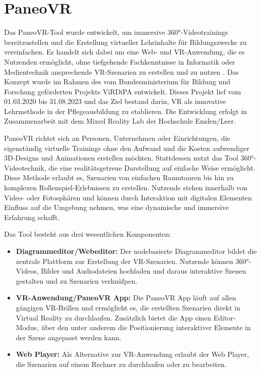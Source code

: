 \section{PaneoVR}

Das PaneoVR-Tool wurde entwickelt, um immersive 360°-Videotrainings bereitzustellen und die Erstellung virtueller Lehrinhalte für Bildungszwecke zu vereinfachen. Es handelt sich dabei um eine Web- und VR-Anwendung, die es Nutzenden ermöglicht, ohne tiefgehende Fachkenntnisse in Informatik oder Medientechnik ansprechende VR-Szenarien zu erstellen und zu nutzen \citep{noauthor_paneovr_nodate}. Das Konzept wurde im Rahmen des vom Bundesministerium für Bildung und Forschung geförderten Projekts ViRDiPA \citep{noauthor_virdipa-_nodate} entwickelt. Dieses Projekt lief vom 01.03.2020 bis 31.08.2023 und das Ziel bestand darin, VR als innovative Lehrmethode in der Pflegeausbildung zu etablieren. Die Entwicklung erfolgt in Zusammenarbeit mit dem Mixed Reality Lab der Hochschule Emden/Leer.

PaneoVR richtet sich an Personen, Unternehmen oder Einrichtungen, die eigenständig virtuelle Trainings ohne den Aufwand und die Kosten aufwendiger 3D-Designs und Animationen erstellen möchten. Stattdessen nutzt das Tool 360°-Videotechnik, die eine realitätsgetreue Darstellung auf einfache Weise ermöglicht. Diese Methode erlaubt es, Szenarien von einfachen Raumtouren bis hin zu komplexen Rollenspiel-Erlebnissen zu erstellen. Nutzende stehen innerhalb von Video- oder Fotosphären und können durch Interaktion mit digitalen Elementen Einfluss auf die Umgebung nehmen, was eine dynamische und immersive Erfahrung schafft.

Das Tool besteht aus drei wesentlichen Komponenten:

\begin{itemize}
    \item \textbf{Diagrammeditor/Webeditor:}
    Der nodebasierte Diagrammeditor bildet die zentrale Plattform zur Erstellung der VR-Szenarien. Nutzende können 360°-Videos, Bilder und Audiodateien hochladen und daraus interaktive Szenen gestalten und zu Szenarien verknüfpen. 
    \item \textbf{VR-Anwendung/PaneoVR App:}
    Die PaneoVR App läuft auf allen gängigen VR-Brillen und ermöglicht es, die erstellten Szenarien direkt in Virtual Reality zu durchlaufen. Zusätzlich bietet die App einen Editor-Modus, über den unter anderem die Positionierung interaktiver Elemente in der Szene angepasst werden kann. 
    \item \textbf{Web Player:}
    Als Alternative zur VR-Anwendung erlaubt der Web Player, die Szenarien auf einem Rechner zu durchlaufen oder zu bearbeiten.
\end{itemize}

